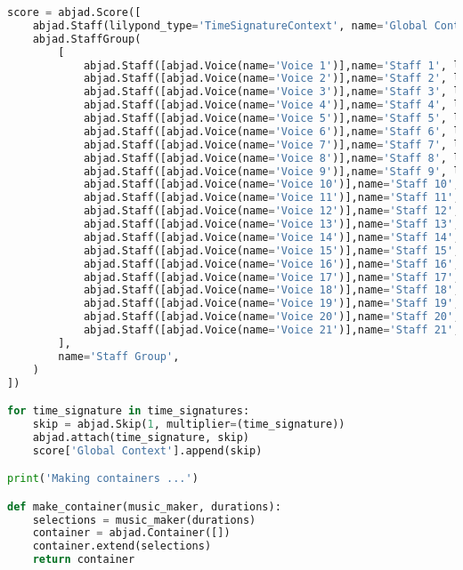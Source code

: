 \begin{lstlisting}[language=Python, caption=Invocation Source Code]
score = abjad.Score([
    abjad.Staff(lilypond_type='TimeSignatureContext', name='Global Context'),
    abjad.StaffGroup(
        [
            abjad.Staff([abjad.Voice(name='Voice 1')],name='Staff 1', lilypond_type='Staff',),
            abjad.Staff([abjad.Voice(name='Voice 2')],name='Staff 2', lilypond_type='Staff',),
            abjad.Staff([abjad.Voice(name='Voice 3')],name='Staff 3', lilypond_type='Staff',),
            abjad.Staff([abjad.Voice(name='Voice 4')],name='Staff 4', lilypond_type='Staff',),
            abjad.Staff([abjad.Voice(name='Voice 5')],name='Staff 5', lilypond_type='Staff',),
            abjad.Staff([abjad.Voice(name='Voice 6')],name='Staff 6', lilypond_type='Staff',),
            abjad.Staff([abjad.Voice(name='Voice 7')],name='Staff 7', lilypond_type='Staff',),
            abjad.Staff([abjad.Voice(name='Voice 8')],name='Staff 8', lilypond_type='Staff',),
            abjad.Staff([abjad.Voice(name='Voice 9')],name='Staff 9', lilypond_type='Staff',),
            abjad.Staff([abjad.Voice(name='Voice 10')],name='Staff 10', lilypond_type='Staff',),
            abjad.Staff([abjad.Voice(name='Voice 11')],name='Staff 11', lilypond_type='Staff',),
            abjad.Staff([abjad.Voice(name='Voice 12')],name='Staff 12', lilypond_type='Staff',),
            abjad.Staff([abjad.Voice(name='Voice 13')],name='Staff 13', lilypond_type='Staff',),
            abjad.Staff([abjad.Voice(name='Voice 14')],name='Staff 14', lilypond_type='Staff',),
            abjad.Staff([abjad.Voice(name='Voice 15')],name='Staff 15', lilypond_type='Staff',),
            abjad.Staff([abjad.Voice(name='Voice 16')],name='Staff 16', lilypond_type='Staff',),
            abjad.Staff([abjad.Voice(name='Voice 17')],name='Staff 17', lilypond_type='Staff',),
            abjad.Staff([abjad.Voice(name='Voice 18')],name='Staff 18', lilypond_type='Staff',),
            abjad.Staff([abjad.Voice(name='Voice 19')],name='Staff 19', lilypond_type='Staff',),
            abjad.Staff([abjad.Voice(name='Voice 20')],name='Staff 20', lilypond_type='Staff',),
            abjad.Staff([abjad.Voice(name='Voice 21')],name='Staff 21', lilypond_type='Staff',),
        ],
        name='Staff Group',
    )
])

for time_signature in time_signatures:
    skip = abjad.Skip(1, multiplier=(time_signature))
    abjad.attach(time_signature, skip)
    score['Global Context'].append(skip)

print('Making containers ...')

def make_container(music_maker, durations):
    selections = music_maker(durations)
    container = abjad.Container([])
    container.extend(selections)
    return container


\end{lstlisting}
